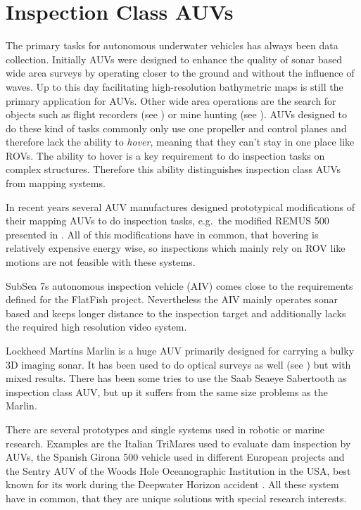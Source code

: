 \documentclass[conference]{IEEEtran}
\begin{document}
\section{Inspection Class AUVs}

The primary tasks for autonomous underwater vehicles has always been data collection.
Initially AUVs were designed to enhance the quality of sonar based wide area surveys by
operating closer to the ground and without the influence of waves. Up to this day
facilitating high-resolution bathymetric maps is still the primary application for AUVs.
Other wide area operations are the search for objects such as flight recorders (see
\cite{purcell2011}) or mine hunting (see \cite{Couillard2012}). AUVs designed to do these
kind of tasks commonly only use one propeller and control planes and therefore lack the
ability to \textit{hover}, meaning that they can't stay in one place like ROVs. The
ability to hover is a key requirement to do inspection tasks on complex structures.
Therefore this ability distinguishes inspection class AUVs from mapping systems.

In recent years several AUV manufactures designed prototypical modifications of their
mapping AUVs to do inspection tasks, e.g.~the modified REMUS 500 presented in
\cite{packard2010}. All of this modifications have in common, that hovering is relatively
expensive energy wise, so inspections which mainly rely on ROV like motions are not
feasible with these systems.

SubSea 7s autonomous inspection vehicle (AIV) \cite{AIV} comes close to the requirements
defined for the FlatFish project. Nevertheless the AIV mainly operates sonar based and
keeps longer distance to the inspection target and additionally lacks the required
high resolution video system.

Lockheed Martins Marlin \cite{Marlinmk1} is a huge AUV primarily designed for carrying a
bulky 3D imaging sonar. It has been used to do optical surveys as well (see
\cite{mcleod2013}) but with mixed results. There has been some tries to use the Saab
Seaeye Sabertooth \cite{johansson2010} as inspection class AUV, but up it suffers from the
same size problems as the Marlin. 

There are several prototypes and single systems used in robotic or marine research.
Examples are the Italian TriMares \cite{cruz2011} used to evaluate dam inspection by AUVs,
the Spanish Girona 500 vehicle \cite{ribas2012} used in different European projects and
the Sentry AUV of the Woods Hole Oceanographic Institution in the USA, best known for its
work during the Deepwater Horizon accident \cite{Kinsey2011}. All these system have in
common, that they are unique solutions with special research interests.
\end{document}
